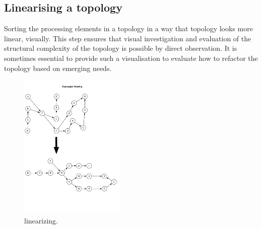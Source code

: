 \subsection{Linearising a topology}

Sorting the processing elements in a topology in a way that topology looks more linear, visually. This step ensures that visual investigation and evaluation of the structural complexity of the topology is possible by direct observation. It is sometimes essential to provide such a visualisation to evaluate how to refactor the topology based on emerging needs.

\begin{figure}[H]
	\begin{center}
		\includegraphics[width=5cm]{images/linearizing}
		\caption{linearizing.}
		\label{fig:linearizing}
	\end{center}
\end{figure}